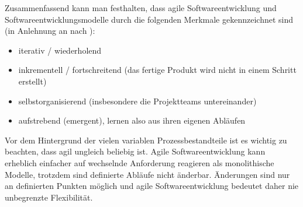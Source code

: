 Zusammenfassend kann man festhalten, dass agile Softwareentwicklung und Softwareentwicklungsmodelle durch die folgenden Merkmale gekennzeichnet sind (in Anlehnung an \cite{moniruzzaman2013comparative} nach \cite{goos_extreme_2002}):
\begin{itemize}
    \item iterativ / wiederholend
    \item inkrementell / fortschreitend (das fertige Produkt wird nicht in einem Schritt erstellt)
    \item selbstorganisierend (insbesondere die Projektteams untereinander)
    \item aufstrebend (\glqq{}emergent\grqq{}), lernen also aus ihren eigenen Abläufen
\end{itemize}
Vor dem Hintergrund der vielen variablen Prozessbestandteile ist es wichtig zu beachten, dass agil ungleich beliebig ist.
Agile Softwareentwicklung kann erheblich einfacher auf wechselnde Anforderung reagieren als monolithische Modelle, trotzdem sind definierte Abläufe nicht änderbar. Änderungen sind nur an definierten Punkten möglich und agile Softwareentwicklung bedeutet daher nie unbegrenzte Flexibilität. 